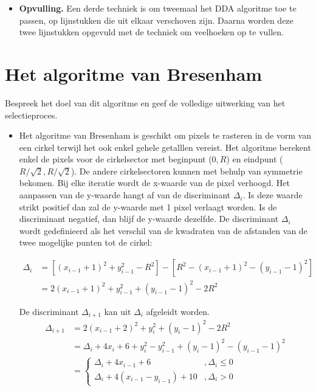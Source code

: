 \documentclass{report}
\begin{document}
\begin{enumerate}
{\begin{itemize}
			\item \textbf{Opvulling.} Een derde techniek is om tweemaal het DDA algoritme toe te passen, op lijnstukken die uit elkaar verschoven zijn. Daarna worden deze twee lijnstukken opgevuld met de techniek om veelhoeken op te vullen.
		\end{itemize}
	}
			
\end{enumerate}

\section{Het algoritme van Bresenham}
\begin{enumerate}
	\vraag
	{
		Bespreek het doel van dit algoritme en geef de volledige uitwerking van het selectieproces. 
	}
	{
		\begin{itemize}
			\item Het algoritme van Bresenham is geschikt om pixels te rasteren in de vorm van een cirkel terwijl het ook enkel gehele getalllen vereist. Het algoritme berekent enkel de pixels voor de cirkelsector met beginpunt ($0, R$) en eindpunt ($R/\sqrt{2},R/\sqrt{2}$). De andere cirkelsectoren kunnen met behulp van symmetrie bekomen. Bij elke iteratie wordt de x-waarde van de pixel verhoogd. Het aanpassen van de y-waarde hangt af van de discriminant $\Delta_i$. Is deze waarde strikt positief dan zal de y-waarde met 1 pixel verlaagt worden. Is de discriminant negatief, dan blijf de y-waarde dezelfde. De discriminant $\Delta_i$ wordt gedefinieerd als het verschil van de kwadraten van de afstanden van de twee mogelijke punten tot de cirkel:
			      				
			      \begin{equation*}
			      	\begin{split}
			      		\Delta_i & = [(x_{i - 1} + 1)^2 + y_{i - 1}^2 - R^2] - [R^2 - (x_{i - 1} + 1)^2 - (y_{i - 1} - 1)^2]  \\
			      		& = 2(x_{i - 1} + 1)^2 + y_{i - 1}^2 + (y_{i - 1} - 1)^2 - 2R^2
			      	\end{split}
			      \end{equation*}	
			      				
			      De discriminant $\Delta_{i + 1}$ kan uit $\Delta_i$ afgeleidt worden.
			      \begin{equation*}
			      	\begin{split}
			      		\Delta_{i + 1} & = 2(x_{i - 1} + 2)^2 + y_i^2 + (y_i - 1)^2 - 2R^2 \\
			      		& = \Delta_i + 4x_i + 6 + y_i^2 - y_{i - 1}^2 + (y_i - 1)^2 - (y_{i - 1} - 1)^2 \\
			      		& = \begin{cases}
			      		\Delta_i + 4x_{i - 1} + 6 &, \Delta_i \leq 0 \\
			      		\Delta_i + 4(x_{i - 1} - y_{i - 1}) + 10  &, \Delta_i > 0
			      		\end{cases}
			      	\end{split}
			      \end{equation*}
			      				

\end{itemize}}
\end{enumerate}
\end{document}
